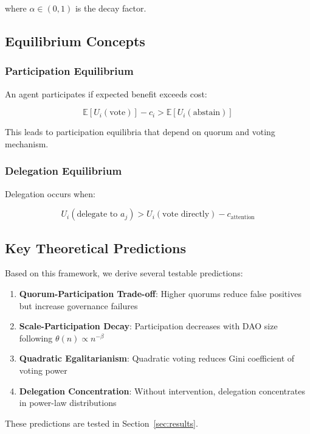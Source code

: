 where $\alpha \in (0, 1)$ is the decay factor.

\subsection{Equilibrium Concepts}

\subsubsection{Participation Equilibrium}

An agent participates if expected benefit exceeds cost:

\begin{equation}
\mathbb{E}[U_i(\text{vote})] - c_i > \mathbb{E}[U_i(\text{abstain})]
\end{equation}

This leads to participation equilibria that depend on quorum and voting mechanism.

\subsubsection{Delegation Equilibrium}

Delegation occurs when:

\begin{equation}
U_i(\text{delegate to } a_j) > U_i(\text{vote directly}) - c_{\text{attention}}
\end{equation}

\subsection{Key Theoretical Predictions}

Based on this framework, we derive several testable predictions:

\begin{enumerate}
    \item \textbf{Quorum-Participation Trade-off}: Higher quorums reduce false positives but increase governance failures
    \item \textbf{Scale-Participation Decay}: Participation decreases with DAO size following $\theta(n) \propto n^{-\beta}$
    \item \textbf{Quadratic Egalitarianism}: Quadratic voting reduces Gini coefficient of voting power
    \item \textbf{Delegation Concentration}: Without intervention, delegation concentrates in power-law distributions
\end{enumerate}

These predictions are tested in Section~\ref{sec:results}.
